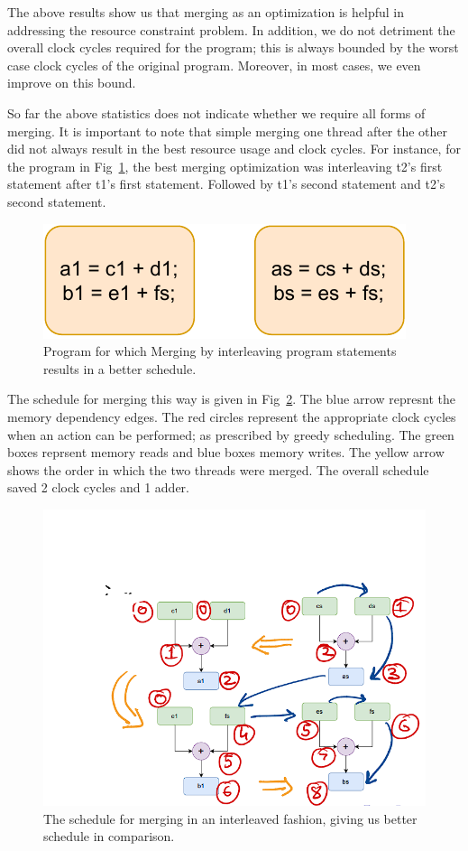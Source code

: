     The above results show us that merging as an optimization is helpful in addressing the resource constraint problem.
    In addition, we do not detriment the overall clock cycles required for the program; this is always bounded by the worst case clock cycles of the original program.
    Moreover, in most cases, we even improve on this bound. 
    
    So far the above statistics does not indicate whether we require all forms of merging. 
    It is important to note that simple merging one thread after the other did not always result in the best resource usage and clock cycles.
    For instance, for the program in Fig~\ref{ex1}, the best merging optimization was interleaving t2's first statement after t1's first statement. Followed by t1's second statement and t2's second statement. 
    \begin{figure}
        \centering
        \includegraphics[scale=0.5]{Ex2.pdf}
        \caption{Program for which Merging by interleaving program statements results in a better schedule.}
        \label{ex1}
    \end{figure}

    The schedule for merging this way is given in Fig~\ref{ex1-schd}.
    The blue arrow represnt the memory dependency edges.
    The red circles represent the appropriate clock cycles when an action can be performed; as prescribed by greedy scheduling.
    The green boxes reprsent memory reads and blue boxes memory writes.
    The yellow arrow shows the order in which the two threads were merged.
    The overall schedule saved 2 clock cycles and 1 adder. 
    \begin{figure}
        \centering
        \includegraphics[scale=0.5]{Ex_schd.PNG}
        \caption{The schedule for merging in an interleaved fashion, giving us better schedule in comparison.}
        \label{ex1-schd}
    \end{figure}